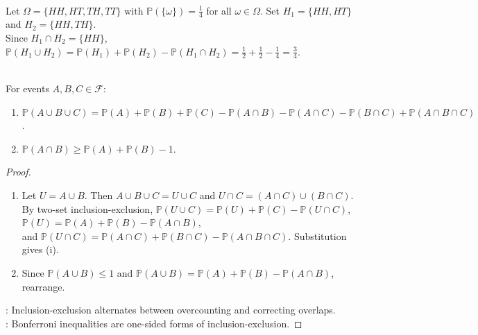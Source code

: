 \begin{example} \label{ex:two-coin-inclusion-exclusion} \\
Let $\Omega=\{HH,HT,TH,TT\}$ with $\mathbb{P}(\{\omega\})=\frac{1}{4}$ for all $\omega\in\Omega$. Set $H_1=\{HH,HT\}$ and $H_2=\{HH,TH\}$.\\
Since $H_1\cap H_2=\{HH\}$, $\mathbb{P}(H_1\cup H_2) =\mathbb{P}(H_1)+\mathbb{P}(H_2)-\mathbb{P}(H_1\cap H_2) =\frac12+\frac12-\frac14 =\frac34$.
\end{example}

\begin{proposition} \label{prop:three-set-inclusion-exclusion-and-bonferroni} \\
For events $A,B,C\in\mathcal{F}$:
\begin{enumerate}[label=(\roman*)]
\setlength{\itemsep}{0pt}
\item $\mathbb{P}(A\cup B\cup C)=\mathbb{P}(A)+\mathbb{P}(B)+\mathbb{P}(C)-\mathbb{P}(A\cap B)-\mathbb{P}(A\cap C)-\mathbb{P}(B\cap C)+\mathbb{P}(A\cap B\cap C)$.
\item $\mathbb{P}(A\cap B)\geq \mathbb{P}(A)+\mathbb{P}(B)-1$.
\end{enumerate}
\begin{proof}
\begin{enumerate}[label=(\roman*)]
\setlength{\itemsep}{0pt}
\item Let $U=A\cup B$. Then $A\cup B\cup C=U\cup C$ and $U\cap C=(A\cap C)\cup(B\cap C)$.\\
By two-set inclusion-exclusion, $\mathbb{P}(U\cup C)=\mathbb{P}(U)+\mathbb{P}(C)-\mathbb{P}(U\cap C)$, $\mathbb{P}(U)=\mathbb{P}(A)+\mathbb{P}(B)-\mathbb{P}(A\cap B)$,\\
and $\mathbb{P}(U\cap C)=\mathbb{P}(A\cap C)+\mathbb{P}(B\cap C)-\mathbb{P}(A\cap B\cap C)$. Substitution gives (i).
\item Since $\mathbb{P}(A\cup B)\leq1$ and $\mathbb{P}(A\cup B)=\mathbb{P}(A)+\mathbb{P}(B)-\mathbb{P}(A\cap B)$, rearrange.
\end{enumerate}
: Inclusion-exclusion alternates between overcounting and correcting overlaps.\\
: Bonferroni inequalities are one-sided forms of inclusion-exclusion.
\end{proof}
\end{proposition}

